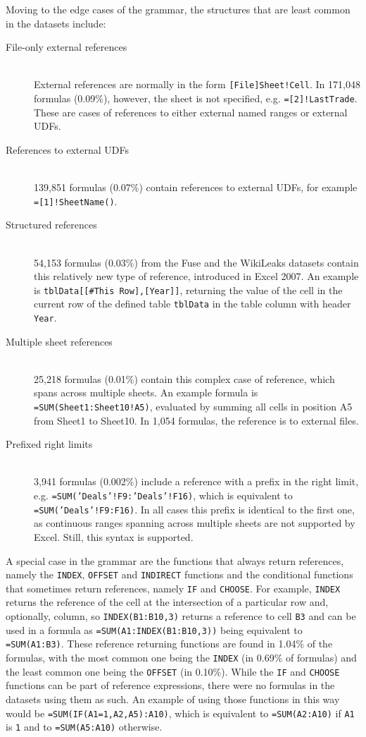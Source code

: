 \documentclass[times]{smrauth}
\begin{document}
Moving to the edge cases of the grammar, the structures that are least common in the datasets include:
\begin{description}
	\item[File-only external references] \hfill \\
	External references are normally in the form \texttt{[File]Sheet!Cell}. In 171,048 formulas (0.09\%), however, the sheet is not specified, e.g. \texttt{=[2]!LastTrade}. These are cases of references to either external named ranges or external UDFs.
	\item[References to external UDFs] \hfill \\
	139,851 formulas (0.07\%) contain references to external UDFs, for example \texttt{=[1]!SheetName()}.
	\item[Structured references] \hfill \\
	54,153 formulas (0.03\%) from the Fuse and the WikiLeaks datasets contain this relatively new type of reference, introduced in Excel 2007. An example is \texttt{tblData[[\#This Row],[Year]]}, returning the value of the cell in the current row of the defined table \texttt{tblData} in the table column with header \texttt{Year}.
	\item[Multiple sheet references] \hfill \\
	25,218 formulas (0.01\%) contain this complex case of reference, which spans across multiple sheets. An example formula is \texttt{=SUM(Sheet1:Sheet10!A5)}, evaluated by summing all cells in position A5 from Sheet1 to Sheet10. In 1,054 formulas, the reference is to external files.
	\item[Prefixed right limits] \hfill \\
	3,941 formulas (0.002\%) include a reference with a prefix in the right limit, e.g. \texttt{=SUM('Deals'!F9:'Deals'!F16)}, which is equivalent to \texttt{=SUM('Deals'!F9:F16)}. In all cases this prefix is identical to the first one, as continuous ranges spanning across multiple sheets are not supported by Excel. Still, this syntax is supported.
\end{description}

A special case in the grammar are the functions that always return references, namely the \texttt{INDEX}, \texttt{OFFSET} and \texttt{INDIRECT} functions and the conditional functions that sometimes return references, namely \texttt{IF} and \texttt{CHOOSE}.
For example, \texttt{INDEX} returns the reference of the cell at the intersection of a particular row and, optionally, column, so \texttt{INDEX(B1:B10,3)} returns a reference to cell \texttt{B3} and can be used in a formula as \texttt{=SUM(A1:INDEX(B1:B10,3))} being equivalent to \texttt{=SUM(A1:B3)}.
These reference returning functions are found in 1.04\% of the formulas, with the most common one being the \texttt{INDEX} (in 0.69\% of formulas) and the least common one being the \texttt{OFFSET} (in 0.10\%).
While the \texttt{IF} and \texttt{CHOOSE} functions can be part of reference expressions, there were no formulas in the datasets using them as such.
An example of using those functions in this way would be \texttt{=SUM(IF(A1=1,A2,A5):A10)}, which is equivalent to \texttt{=SUM(A2:A10)} if \texttt{A1} is \texttt{1} and to \texttt{=SUM(A5:A10)} otherwise.
\end{document}

